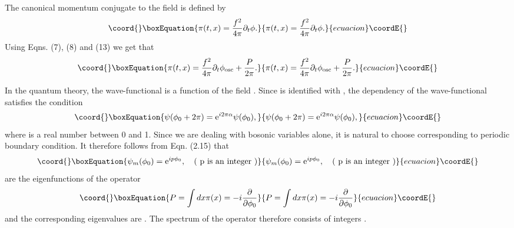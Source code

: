 \documentclass[a4paper,12pt]{article}
\begin{document}
The canonical momentum conjugate to the field \myHighlight{$\phi$}\coordHE{} is defined by 
\begin{equation}\coord{}\boxEquation{
{\pi}(t,x)=\frac{f^2}{4{\pi}}{\partial}_{t}{\phi}.
}{
{\pi}(t,x)=\frac{f^2}{4{\pi}}{\partial}_{t}{\phi}.
}{ecuacion}\coordE{}\end{equation}
Using Eqns. (7), (8) and (13)  we get that
\begin{equation}\coord{}\boxEquation{
\pi(t,x) = \frac{f^2}{4{\pi}}{\partial}_{t}{\phi}_{\rm {osc}}
 + \frac{P}{2{\pi}}.
}{
\pi(t,x) = \frac{f^2}{4{\pi}}{\partial}_{t}{\phi}_{\rm {osc}}
 + \frac{P}{2{\pi}}.
}{ecuacion}\coordE{}\end{equation}

In the quantum theory, 
the wave-functional \myHighlight{$\psi$}\coordHE{} is a function of the field \myHighlight{$\phi$}\coordHE{}.
Since \coordHE{} is identified with \coordHE{}, the \coordHE{}
dependency of the wave-functional \myHighlight{$\psi$}\coordHE{} satisfies the condition
\begin{equation}\coord{}\boxEquation{
\psi (\phi_0 + 2 \pi) = {\rm e}^{i 2 \pi \alpha} \psi (\phi_0),
}{
\psi (\phi_0 + 2 \pi) = {\rm e}^{i 2 \pi \alpha} \psi (\phi_0),
}{ecuacion}\coordE{}\end{equation}
where \myHighlight{$\alpha$}\coordHE{} is a real number between 0 and 1. Since we are dealing with
bosonic variables alone, it is natural to choose \coordHE{} corresponding
to periodic boundary condition. It therefore follows from Eqn. (2.15) that
\begin{equation}\coord{}\boxEquation{
\psi_m (\phi_0) = {\rm e}^{i p \phi_0},~~~ {\rm (~p~ is~ an~ integer~)}
}{
\psi_m (\phi_0) = {\rm e}^{i p \phi_0},~~~ {\rm (~p~ is~ an~ integer~)}
}{ecuacion}\coordE{}\end{equation}
are the eigenfunctions of the operator 
\begin{equation}\coord{}\boxEquation{
P = \int dx \pi (x) = -i \frac{\partial}{\partial \phi_0}
}{
P = \int dx \pi (x) = -i \frac{\partial}{\partial \phi_0}
}{ecuacion}\coordE{}\end{equation}
and the corresponding eigenvalues are \coordHE{}.
The spectrum of the operator \coordHE{} therefore consists of integers \coordHE{}.
\end{document}
